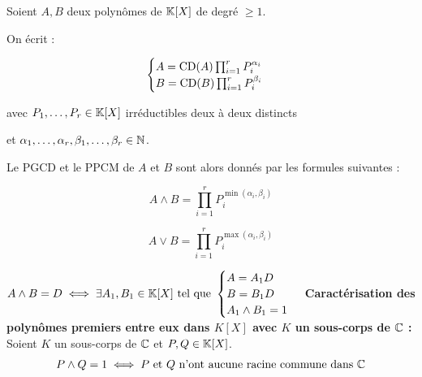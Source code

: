 \documentclass[12pt, a4paper]{report}
\begin{document}
\begin{theorem}
    Soient $A,B$ deux polynômes de $\mathbb{K}[X]$ de degré $\ge 1$.

    On écrit :

    $$\begin{cases}
    A = \mathrm{CD}(A) \prod_{i=1}^{r} P_i^{\alpha_i}\\
    B = \mathrm{CD}(B) \prod_{i=1}^{r} P_i^{\beta_i}
    \end{cases}$$

    avec $P_1,\dots,P_r \in \mathbb{K}[X]$ irréductibles deux à deux distincts
    
    et $\alpha_1,\dots,\alpha_r, \beta_1,\dots,\beta_r \in \mathbb{N}$.

    Le PGCD et le PPCM de $A$ et $B$ sont alors donnés par les formules suivantes :

    $$A \wedge B = \prod_{i=1}^{r} P_i^{\min(\alpha_i,\beta_i)}$$
    
    $$A \vee B = \prod_{i=1}^{r} P_i^{\max(\alpha_i,\beta_i)}$$
    
\end{theorem}

\begin{remark}
    \begin{outline}[enumerate]
        \1 $A \wedge B = D \iff \exists A_1,B_1 \in \mathbb{K}[X] \text{ tel que } \begin{cases} A = A_1 D \\ B = B_1 D \\ A_1 \wedge B_1 = 1 \end{cases}$
        \1 \textbf{Caractérisation des polynômes premiers entre eux dans $K[X]$ avec $K$ un sous-corps de $\mathbb{C}$ :}
        \2 Soient $K$ un sous-corps de $\mathbb{C}$ et $P,Q \in \mathbb{K}[X]$.
        $$P \wedge Q = 1 \iff P \text{ et } Q \text{ n'ont aucune racine commune dans } \mathbb{C}$$
    \end{outline}
\end{remark}
\end{document}
